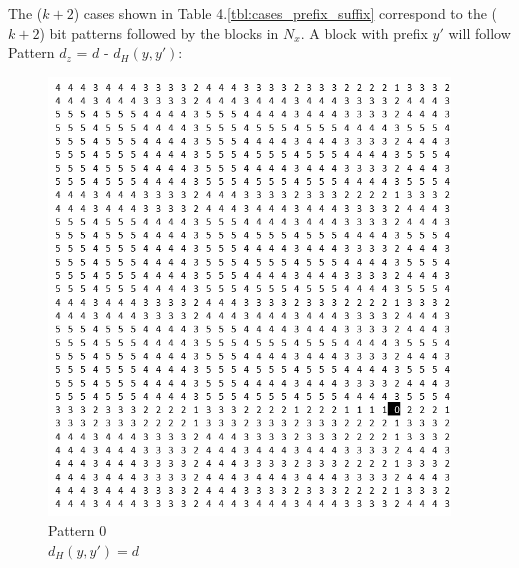 \documentclass[oneside,12pt]{DISCSthesis}
\begin{document}
{		\newpage
		\noindent The ($k+2$) cases shown in Table 4.\ref{tbl:cases_prefix_suffix} correspond to the ($k+2$) bit patterns followed by the blocks in $N_x$. A block with prefix $y'$ will follow Pattern $d_z$ = $d$ - $d_H(y,y')$:

		\begin{figure}[h]\label{fig:cases_block_patterns}
			\footnotesize
			\begin{minipage}{.33\textwidth}\centering\includegraphics[width=0.95\textwidth]{img/0}\\ Pattern 0 \\$d_H(y,y') = d$ \end{minipage} 

\end{figure}}
\end{document}
